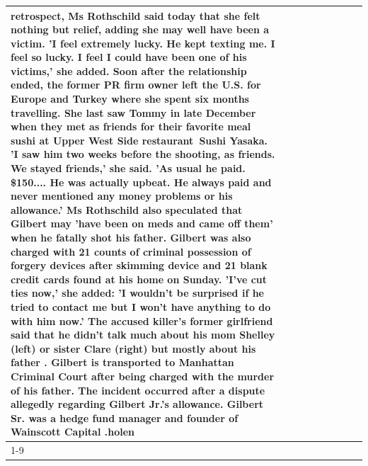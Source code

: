 \begin{table}[H]
\begin{tabular}{lllrlllll}
retrospect, Ms Rothschild said today that she felt nothing but relief, adding she may well have been a victim. 'I feel extremely lucky. He kept texting me. I feel so lucky. I feel I could have been one of his victims,' she added. Soon after the relationship ended, the former PR firm owner left the U.S. for Europe and Turkey where she spent six months  travelling. She last saw Tommy in late December when they met as friends for their favorite meal sushi at Upper West Side restaurant Sushi Yasaka. 'I saw him two weeks before the shooting, as friends. We stayed friends,' she said. 'As usual he paid. \$150.... He was actually upbeat. He always paid and never mentioned any money problems or his allowance.' Ms Rothschild also speculated that Gilbert may 'have been on meds and came off them' when he fatally shot his father. Gilbert was also charged with 21 counts of criminal possession of forgery devices after skimming device and 21 blank credit cards found at his home on Sunday. 'I've cut ties now,' she added: 'I wouldn’t be surprised if he tried to contact me but I won’t have anything to do with him now.' The accused killer's former girlfriend said that he didn't talk much about his mom Shelley (left) or sister Clare (right) but mostly about his father . Gilbert is transported to Manhattan Criminal Court  after being charged with the murder of his father. The incident occurred after a dispute allegedly regarding Gilbert Jr.'s allowance. Gilbert Sr. was a hedge fund manager and founder of Wainscott Capital .holen \\
\cline{1-9}

\end{tabular}
\end{table}
